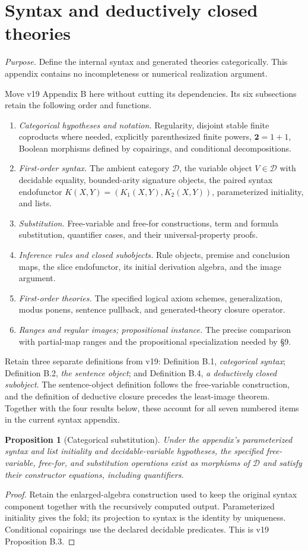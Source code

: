 \documentclass[11pt]{article}
\newtheorem{proposition}[theorem]{Proposition}
\theoremstyle{definition}\newtheorem{definition}[theorem]{Definition}
\newcommand{\D}{\mathcal D}
\newcommand{\purpose}[1]{\noindent\textit{Purpose.} #1\par\medskip}
\begin{document}
\appendix
\section{Syntax and deductively closed theories}
\purpose{Define the internal syntax and generated theories categorically. This appendix contains no incompleteness or numerical realization argument.}
Move v19 Appendix B here without cutting its dependencies. Its
six subsections retain the following order and functions.
\begin{enumerate}
\item \emph{Categorical hypotheses and notation.} Regularity,
  disjoint stable finite coproducts where needed, explicitly
  parenthesized finite powers, $\mathbf2=1+1$, Boolean morphisms
  defined by copairings, and conditional decompositions.
\item \emph{First-order syntax.} The ambient category $\D$, the
  variable object $V\in\D$ with decidable equality, bounded-arity
  signature objects, the paired syntax endofunctor
  $K(X,Y)=(K_1(X,Y),K_2(X,Y))$, parameterized initiality, and lists.
\item \emph{Substitution.} Free-variable and free-for constructions,
  term and formula substitution, quantifier cases, and their
  universal-property proofs.
\item \emph{Inference rules and closed subobjects.} Rule objects,
  premise and conclusion maps, the slice endofunctor, its initial
  derivation algebra, and the image argument.
\item \emph{First-order theories.} The specified logical axiom
  schemes, generalization, modus ponens, sentence pullback, and
  generated-theory closure operator.
\item \emph{Ranges and regular images; propositional instance.}
  The precise comparison with partial-map ranges and the
  propositional specialization needed by \S9.
\end{enumerate}
Retain three separate definitions from v19: Definition B.1,
\emph{categorical syntax}; Definition B.2, \emph{the sentence object};
and Definition B.4, \emph{a deductively closed subobject}.
The sentence-object definition follows the free-variable construction,
and the definition of deductive closure precedes the least-image
theorem. Together with the four results below, these account for
all seven numbered items in the current syntax appendix.

\begin{proposition}[Categorical substitution]
Under the appendix's parameterized syntax and list initiality and
decidable-variable hypotheses, the specified free-variable,
free-for, and substitution operations exist as morphisms of $\D$
and satisfy their constructor equations, including quantifiers.
\end{proposition}
\begin{proof}
Retain the enlarged-algebra construction used to keep the original
syntax component together with the recursively computed output.
Parameterized initiality gives the fold; its projection to syntax
is the identity by uniqueness. Conditional copairings use the
declared decidable predicates. This is v19 Proposition B.3.
\end{proof}
\end{document}
